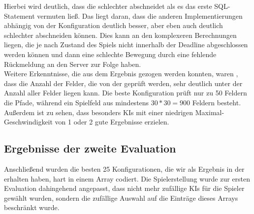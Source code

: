 Hierbei wird deutlich, dass die  schlechter abschneidet als es das erste SQL-Statement vermuten ließ.
Das liegt daran, dass die anderen Implementierungen abhängig von der Konfiguration deutlich besser, aber eben auch
deutlich schlechter abschneiden können.
Dies kann an den komplexeren Berechnungen liegen, die je nach Zustand des Spiels nicht innerhalb der Deadline
abgeschlossen werden können und dann eine schlechte Bewegung durch eine fehlende Rückmeldung an den Server zur Folge
haben. \\

Weitere Erkenntnisse, die aus dem Ergebnis gezogen werden konnten, waren \ua, dass die Anzahl der Felder, die von der
 geprüft werden, sehr deutlich unter der Anzahl aller Felder liegen kann.
Die beste Konfiguration prüft nur zu 50 Feldern die Pfade, während ein Spielfeld aus mindestens $30 * 30 = 900$ Feldern
besteht.
Außerdem ist zu sehen, dass besonders \ac{KI}s mit einer niedrigen Maximal-Geschwindigkeit von 1 oder 2 gute Ergebnisse
erzielen.

\subsection{Ergebnisse der zweite Evaluation}
\label{subsec:zweite-evaluation}

Anschließend wurden die besten 25 Konfigurationen, die wir als Ergebnis in der 
erhalten haben, hart in einem Array codiert.
Die Spielerstellung wurde zur ersten Evaluation dahingehend angepasst, dass nicht mehr zufällige \ac{KI}s für die
Spieler gewählt wurden, sondern die zufällige Auswahl auf die Einträge dieses Arrays beschränkt wurde.

